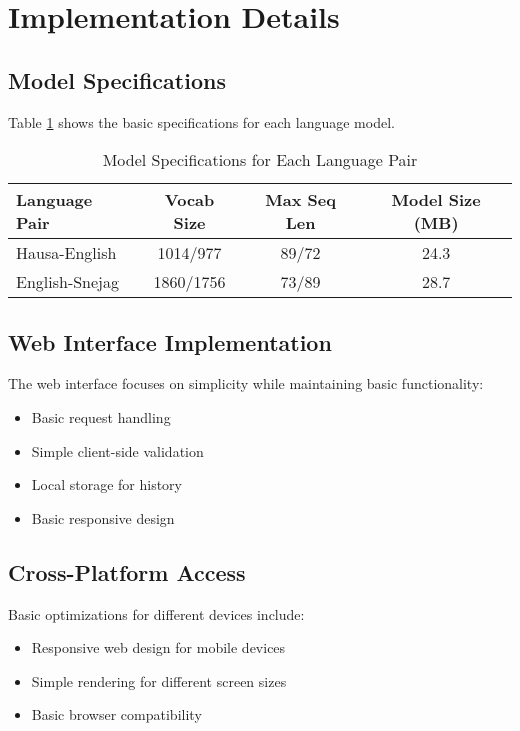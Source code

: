 \documentclass[conference]{IEEEtran}
\begin{document}
\section{Implementation Details}

\subsection{Model Specifications}

Table \ref{tab:model-specs} shows the basic specifications for each language model.

\begin{table}[htbp]
\centering
\caption{Model Specifications for Each Language Pair}
\label{tab:model-specs}
\begin{tabular}{@{}lccc@{}}
\toprule
Language Pair & Vocab Size & Max Seq Len & Model Size (MB) \\
\midrule
Hausa-English & 1014/977 & 89/72 & 24.3 \\
English-Snejag & 1860/1756 & 73/89 & 28.7 \\
\bottomrule
\end{tabular}
\end{table}

\subsection{Web Interface Implementation}

The web interface focuses on simplicity while maintaining basic functionality:

\begin{itemize}
    \item Basic request handling
    \item Simple client-side validation
    \item Local storage for history
    \item Basic responsive design
\end{itemize}

\subsection{Cross-Platform Access}

Basic optimizations for different devices include:

\begin{itemize}
    \item Responsive web design for mobile devices
    \item Simple rendering for different screen sizes
    \item Basic browser compatibility
\end{itemize}
\end{document}
